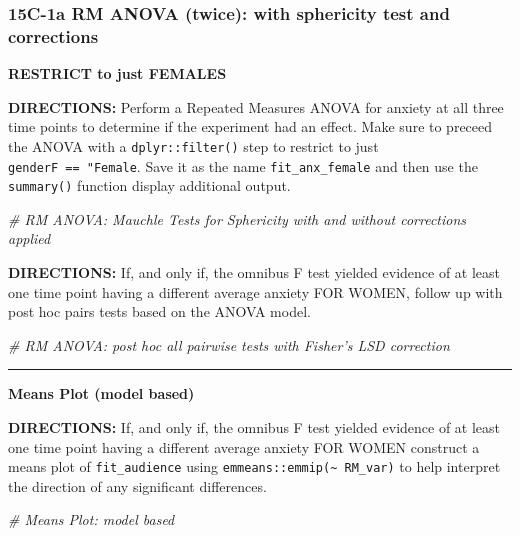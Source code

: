 \documentclass[
]{article}
\newenvironment{Shaded}{\begin{snugshade}}{\end{snugshade}}
\newcommand{\CommentTok}[1]{\textcolor[rgb]{0.56,0.35,0.01}{\textit{#1}}}
\begin{document}
\clearpage

\hypertarget{c-1a-rm-anova-twice-with-sphericity-test-and-corrections}{%
\subsubsection{15C-1a RM ANOVA (twice): with sphericity test and
corrections}\label{c-1a-rm-anova-twice-with-sphericity-test-and-corrections}}

\textbf{RESTRICT to just FEMALES}

\textbf{DIRECTIONS:} Perform a Repeated Measures ANOVA for anxiety at
all three time points to determine if the experiment had an effect. Make
sure to preceed the ANOVA with a \texttt{dplyr::filter()} step to
restrict to just \texttt{genderF\ ==\ "Female}. Save it as the name
\texttt{fit\_anx\_female} and then use the \texttt{summary()} function
display additional output.

\begin{Shaded}
\begin{Highlighting}[]
\CommentTok{# RM ANOVA: Mauchle Tests for Sphericity with and without corrections applied}
\end{Highlighting}
\end{Shaded}

\clearpage

\textbf{DIRECTIONS:} If, and only if, the omnibus F test yielded
evidence of at least one time point having a different average anxiety
FOR WOMEN, follow up with post hoc pairs tests based on the ANOVA model.

\begin{Shaded}
\begin{Highlighting}[]
\CommentTok{# RM ANOVA: post hoc all pairwise tests with Fisher's LSD correction}
\end{Highlighting}
\end{Shaded}

\begin{center}\rule{0.5\linewidth}{\linethickness}\end{center}

\textbf{Means Plot (model based)}

\textbf{DIRECTIONS:} If, and only if, the omnibus F test yielded
evidence of at least one time point having a different average anxiety
FOR WOMEN construct a means plot of \texttt{fit\_audience} using
\texttt{emmeans::emmip(\textasciitilde{}\ RM\_var)} to help interpret
the direction of any significant differences.

\begin{Shaded}
\begin{Highlighting}[]
\CommentTok{# Means Plot: model based}
\end{Highlighting}
\end{Shaded}
\end{document}
